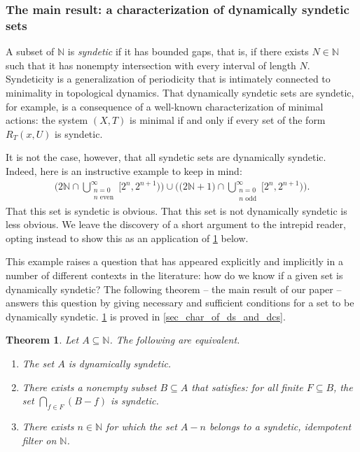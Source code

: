 \documentclass[letter,11pt]{article}
\theoremstyle{plain}
\theoremstyle{definition}
\theoremstyle{plain}
\newcounter{MainTheoremCounter}
\newtheorem{Maintheorem}[MainTheoremCounter]{Theorem}
\theoremstyle{plain}
\numberwithin{equation}{section}
\newcommand{\N}{\mathbb{N}}
\begin{document}
\subsubsection{The main result: a characterization of dynamically syndetic sets}
\label{sec_intro_char_of_ds_sets}

A subset of $\N$ is \emph{syndetic} if it has bounded gaps, that is, if there exists $N \in \N$ such that it has nonempty intersection with every interval of length $N$.  Syndeticity is a generalization of periodicity that is intimately connected to minimality in topological dynamics.  That dynamically syndetic sets are syndetic, for example, is a consequence of a well-known characterization of minimal actions: the system $(X,T)$ is minimal if and only if every set of the form $R_T(x,U)$ is syndetic.

It is not the case, however, that all syndetic sets are dynamically syndetic.  Indeed, here is an instructive example to keep in mind:
\begin{align}
    \label{eqn_intro_even_odd}
    \bigg( 2 \N \cap \bigcup_{\substack{n = 0 \\ \text{$n$ even}}}^\infty \big[ 2^{n}, 2^{n + 1}\big) \bigg) \cup \bigg( \big( 2\N + 1 \big) \cap \bigcup_{\substack{n = 0 \\ \text{$n$ odd}}}^\infty \big[ 2^{n}, 2^{n + 1}\big) \bigg).
\end{align}
That this set is syndetic is obvious.  That this set is not dynamically syndetic is less obvious.  We leave the discovery of a short argument to the intrepid reader, opting instead to show this as an application of \cref{mainthm_ds_equivalents} below.

This example raises a question that has appeared explicitly and implicitly in a number of different contexts in the literature: how do we know if a given set is dynamically syndetic? The following theorem -- the main result of our paper -- answers this question by giving necessary and sufficient conditions for a set to be dynamically syndetic.  \cref{mainthm_ds_equivalents} is proved in \cref{sec_char_of_ds_and_dcs}.


\begin{Maintheorem}
\label{mainthm_ds_equivalents}
    Let $A \subseteq \N$.  The following are equivalent.
    \begin{enumerate}
        \item
        \label{item_intro_ds_def_condition}
        The set $A$ is dynamically syndetic.

        \item
        \label{item_intro_ds_combo_condition}
        There exists a nonempty subset $B \subseteq A$ that satisfies: for all finite $F \subseteq B$, the set $\bigcap_{f \in F} (B-f)$ is syndetic.

        \item
        \label{item_intro_translate_belongs_to_sif}
        There exists $n \in \N$ for which the set $A - n$ belongs to a syndetic, idempotent filter on $\N$.
    \end{enumerate}
\end{Maintheorem}
\end{document}
